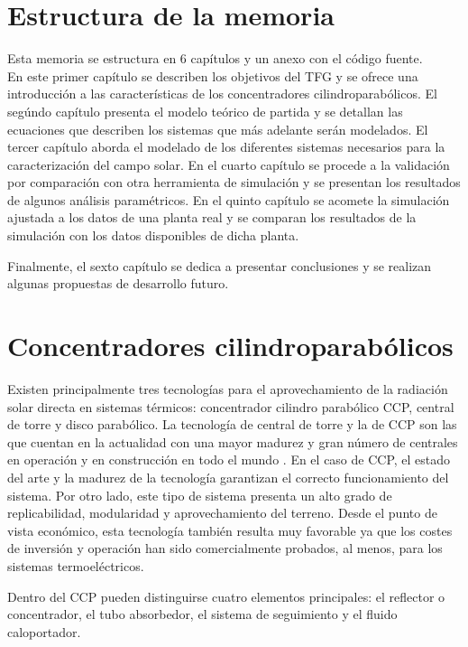 \section{Estructura de la memoria}
Esta memoria se estructura en 6 capítulos y un anexo con el código fuente.\\

En este primer capítulo se describen los objetivos del TFG y se ofrece una introducción a las características de los concentradores cilindroparabólicos. 
El segúndo capítulo presenta el modelo teórico de partida y se detallan las ecuaciones que describen los sistemas que más adelante serán modelados.
El tercer capítulo aborda el modelado de los diferentes sistemas necesarios para la caracterización del campo solar.
En el cuarto capítulo se procede a la validación por comparación con otra herramienta de simulación y se presentan los resultados de algunos análisis paramétricos.
En el quinto capítulo se acomete la simulación ajustada a los datos de una planta real y se comparan los resultados de la simulación con los datos disponibles de dicha planta.

Finalmente, el sexto capítulo se dedica a presentar conclusiones y se realizan algunas propuestas de desarrollo futuro.

\section{Concentradores cilindroparabólicos}

Existen principalmente tres tecnologías para el aprovechamiento de la radiación solar directa en sistemas térmicos: concentrador cilindro parabólico CCP, central de torre y disco parabólico. La tecnología de central de torre y la de CCP son las que cuentan en la actualidad con una mayor madurez y gran número de centrales en operación y en construcción en todo el mundo \cite{Protermosolar}. En el caso de CCP, el
estado del arte y la madurez de la tecnología garantizan el correcto funcionamiento del sistema. Por
otro lado, este tipo de sistema presenta un alto grado de replicabilidad, modularidad y
aprovechamiento del terreno. Desde el punto de vista económico, esta tecnología también resulta
muy favorable ya que los costes de inversión y operación han sido comercialmente probados, al
menos, para los sistemas termoeléctricos.

Dentro del CCP pueden distinguirse cuatro elementos principales: el reflector o concentrador, el tubo absorbedor, el sistema de seguimiento y el fluido caloportador.

